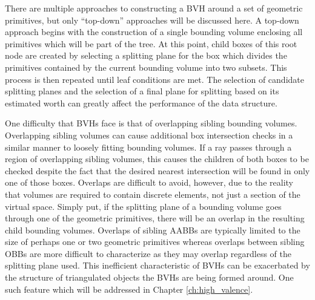 There are multiple approaches to constructing a BVH around a set
of geometric primitives, but only ``top-down'' approaches will be discussed
here. A top-down approach begins with the construction of a single bounding
volume enclosing all primitives which will be part of the tree. At this point,
child boxes of this root node are created by selecting a splitting plane for
the box which divides the primitives contained by the current bounding volume
into two subsets. This process is then repeated until leaf conditions are
met. The selection of candidate splitting planes and the selection of a final
plane for splitting based on its estimated worth can greatly affect the
performance of the data structure.

One difficulty that BVHs face is that of overlapping sibling bounding
volumes. Overlapping sibling volumes can cause additional box intersection
checks in a similar manner to loosely fitting bounding volumes. If a ray passes
through a region of overlapping sibling volumes, this causes the children of
both boxes to be checked despite the fact that the desired nearest intersection
will be found in only one of those boxes. Overlaps are difficult to avoid,
however, due to the reality that volumes are required to contain discrete
elements, not just a section of the virtual space. Simply put, if
the splitting plane of a bounding volume goes through one of the geometric
primitives, there will be an overlap in the resulting child bounding
volumes. Overlaps of sibling AABBs are typically limited to the size of perhaps
one or two geometric primitives whereas overlaps between sibling OBBs are more
difficult to characterize as they may overlap regardless of the splitting plane
used. This inefficient characteristic of BVHs can be exacerbated by the
structure of triangulated objects the BVHs are being formed around. One such
feature which will be addressed in Chapter \ref{ch:high_valence}.

